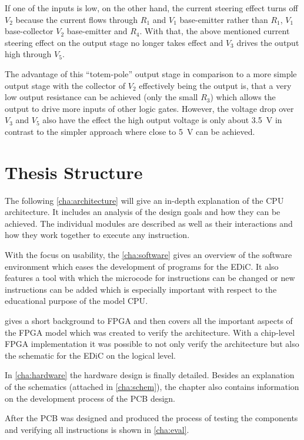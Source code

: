 If one of the inputs is low, on the other hand, the current steering effect turns off $V_2$ because the current flows through $R_1$ and $V_1$ base-emitter rather than $R_1$, $V_1$ base-collector $V_2$ base-emitter and $R_4$.
With that, the above mentioned current steering effect on the output stage no longer takes effect and $V_3$ drives the output high through $V_5$.

The advantage of this ``totem-pole'' output stage in comparison to a more simple output stage with the collector of $V_2$ effectively being the output is, that a very low output resistance can be achieved (only the small $R_3$) which allows the output to drive more inputs of other logic gates.
However, the voltage drop over $V_3$ and $V_5$ also have the effect the high output voltage is only about \qty{3.5}{\volt} in contrast to the simpler approach where close to \qty{5}{\volt} can be achieved.


\section{Thesis Structure}
The following \cref{cha:architecture} will give an in-depth explanation of the \gls{CPU} architecture.
It includes an analysis of the design goals and how they can be achieved.
The individual modules are described as well as their interactions and how they work together to execute any instruction.

With the focus on usability, the \cref{cha:software} gives an overview of the software environment which eases the development of programs for the \gls{EDiC}.
It also features a tool with which the microcode for instructions can be changed or new instructions can be added which is especially important with respect to the educational purpose of the model \gls{CPU}.

 gives a short background to \gls{FPGA} and then covers all the important aspects of the \gls{FPGA} model which was created to verify the architecture.
With a chip-level \gls{FPGA} implementation it was possible to not only verify the architecture but also the schematic for the \gls{EDiC} on the logical level.

In \cref{cha:hardware} the hardware design is finally detailed.
Besides an explanation of the schematics (attached in \cref{cha:schem}), the chapter also contains  information on the development process of the \gls{PCB} design.

After the \gls{PCB} was designed and produced the process of testing the components and verifying all instructions is shown in \cref{cha:eval}.

